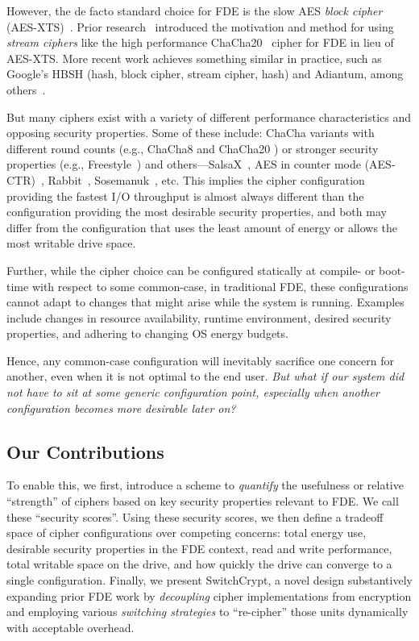 However, the de facto standard choice for FDE is the slow AES \emph{block
cipher} (AES-XTS)~\cite{AES, AES-XTS}. Prior research~\cite{StrongBox}
introduced the motivation and method for using \emph{stream ciphers} like the
high performance ChaCha20~\cite{ChaCha20} cipher for FDE in lieu of AES-XTS.
More recent work achieves something similar in practice, such as Google's HBSH
(hash, block cipher, stream cipher, hash) and Adiantum, among others~\cite{HBSH,
Adiantum}.

But many ciphers exist with a variety of different performance characteristics
and opposing security properties. Some of these include: ChaCha variants with
different round counts (e.g., ChaCha8 \cite{ChaCha8} and ChaCha20
\cite{ChaCha20}) or stronger security properties (e.g.,
Freestyle~\cite{Freestyle}) and others---SalsaX~\cite{SalsaX}, AES in counter
mode (AES-CTR)~\cite{AES-CTR}, Rabbit~\cite{Rabbit}, Sosemanuk~\cite{Sosemanuk},
etc. This implies the cipher configuration providing the fastest I/O throughput
is almost always different than the configuration providing the most desirable
security properties, and both may differ from the configuration that uses the
least amount of energy or allows the most writable drive space.

Further, while the cipher choice can be configured statically at compile- or
boot-time with respect to some common-case, in traditional FDE, these
configurations cannot adapt to changes that might arise while the system is
running. Examples include changes in resource availability, runtime environment,
desired security properties, and adhering to changing OS energy budgets.

Hence, any common-case configuration will inevitably sacrifice one concern for
another, even when it is not optimal to the end user. \emph{But what if our
system did not have to sit at some generic configuration point, especially when
another configuration becomes more desirable later on?}

\subsection{Our Contributions}

To enable this, we first, introduce a scheme to \emph{quantify} the usefulness
or relative ``strength'' of ciphers based on key security properties relevant to
FDE. We call these ``security scores''. Using these security scores, we then
define a tradeoff space of cipher configurations over competing concerns: total
energy use, desirable security properties in the FDE context, read and write
performance, total writable space on the drive, and how quickly the drive can
converge to a single configuration. Finally, we present SwitchCrypt, a novel
design substantively expanding prior FDE work by \emph{decoupling} cipher
implementations from encryption and employing various \emph{switching
strategies} to ``re-cipher'' those units dynamically with acceptable overhead.

